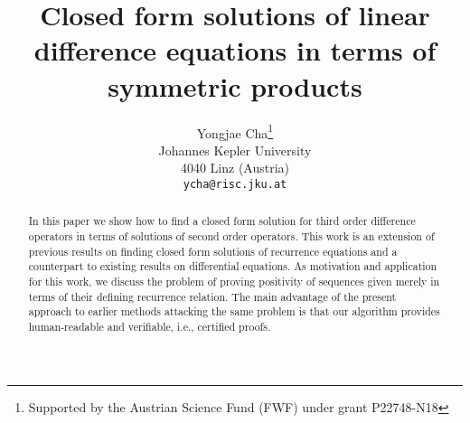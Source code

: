 \documentclass{article}
\begin{document}
\title{Closed form solutions of linear difference equations in terms of symmetric products}



\author{Yongjae Cha\thanks{Supported by the Austrian Science Fund (FWF) under grant P22748-N18}\\
Johannes Kepler University\\
      4040 Linz (Austria)\\
\texttt{ycha@risc.jku.at}}


\maketitle

\begin{abstract}
In this paper we show how to find a closed form solution for third
order difference operators in terms of solutions of second order
operators. This work is an extension of previous results on finding
closed form solutions of recurrence equations and a counterpart to
existing results on differential equations. As motivation and
application for this work, we discuss the problem of proving
positivity of sequences given merely in terms of their defining
recurrence relation. The main advantage of the present approach to
earlier methods attacking the same problem is that our algorithm
provides human-readable and verifiable, i.e., certified proofs.
\end{abstract}
\end{document}
